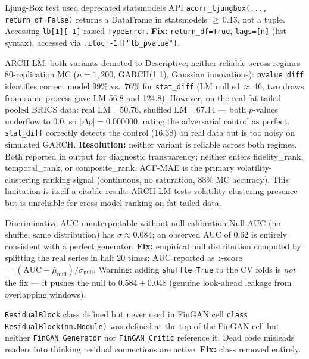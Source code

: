 \documentclass[10pt]{article}
\begin{document}
%
  {Ljung-Box test used deprecated statsmodels API}%
  {\texttt{acorr\_ljungbox(..., return\_df=False)} returns a DataFrame in statsmodels $\geq$\,0.13, not a tuple. Accessing \texttt{lb[1][-1]} raised \texttt{TypeError}. \textbf{Fix:} \texttt{return\_df=True}, \texttt{lags=[n]} (list syntax), accessed via \texttt{.iloc[-1]["lb\_pvalue"]}.}

%
  {ARCH-LM: both variants demoted to Descriptive; neither reliable across regimes}%
  {80-replication MC ($n=1{,}200$, GARCH(1,1), Gaussian innovations): \texttt{pvalue\_diff} identifies correct model 99\% vs.\ 76\% for \texttt{stat\_diff} (LM null sd\,$\approx$\,46; two draws from same process gave LM 56.8 and 124.8). However, on the real fat-tailed pooled BRICS data: real LM\,=\,50.76, shuffled LM\,=\,67.14 --- both $p$-values underflow to 0.0, so $|\Delta p|=0.000000$, rating the adversarial control as perfect. \texttt{stat\_diff} correctly detects the control (16.38) on real data but is too noisy on simulated GARCH. \textbf{Resolution:} neither variant is reliable across both regimes. Both reported in output for diagnostic transparency; neither enters fidelity\_rank, temporal\_rank, or composite\_rank. ACF-MAE is the primary volatility-clustering ranking signal (continuous, no saturation, 88\% MC accuracy). This limitation is itself a citable result: ARCH-LM tests volatility clustering presence but is unreliable for cross-model ranking on fat-tailed data.}

%
  {Discriminative AUC uninterpretable without null calibration}%
  {Null AUC (no shuffle, same distribution) has $\sigma \approx 0.084$; an observed AUC of 0.62 is entirely consistent with a perfect generator. \textbf{Fix:} empirical null distribution computed by splitting the real series in half 20 times; AUC reported as $z$-score $= (\text{AUC} - \bar{\mu}_\text{null})/\sigma_\text{null}$. Warning: adding \texttt{shuffle=True} to the CV folds is \emph{not} the fix --- it pushes the null to $0.584 \pm 0.048$ (genuine look-ahead leakage from overlapping windows).}

%
  {\texttt{ResidualBlock} class defined but never used in FinGAN cell}%
  {\texttt{class ResidualBlock(nn.Module)} was defined at the top of the FinGAN cell but neither \texttt{FinGAN\_Generator} nor \texttt{FinGAN\_Critic} reference it. Dead code misleads readers into thinking residual connections are active. \textbf{Fix:} class removed entirely.}
\end{document}

